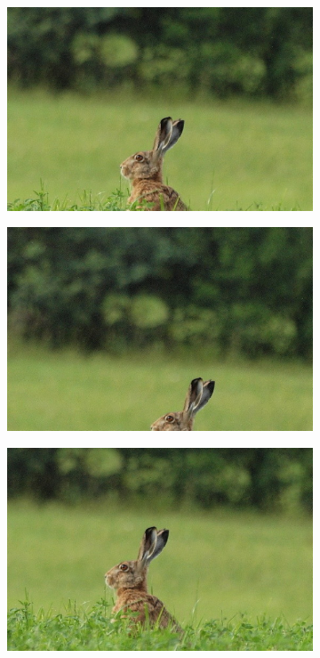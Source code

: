 \begin{figure}[H]
    \begin{subfigure}{0.32\textwidth}
      \centering
      \includegraphics[scale=1.0]{obrazky/cropIttizajic2-small.jpg}
      \caption{}
    \end{subfigure}
    \begin{subfigure}{.32\textwidth}
      \centering
      \includegraphics[scale=1.0]{obrazky/cropAchantazajic2-small.jpg}
      \caption{}
    \end{subfigure}
    \begin{subfigure}{.32\textwidth}
      \centering
      \includegraphics[scale=1.0]{obrazky/cropStentifordzajic2-small.jpg}
      \caption{}
    \end{subfigure}
    \vspace{1pt}
    

\end{figure}
